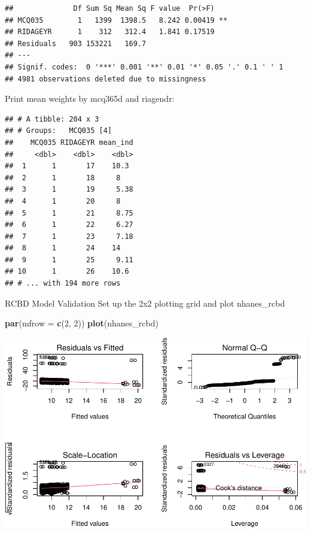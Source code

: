 \documentclass[]{book}
\newenvironment{Shaded}{\begin{snugshade}}{\end{snugshade}}
\newcommand{\DataTypeTok}[1]{\textcolor[rgb]{0.13,0.29,0.53}{#1}}
\newcommand{\DecValTok}[1]{\textcolor[rgb]{0.00,0.00,0.81}{#1}}
\newcommand{\KeywordTok}[1]{\textcolor[rgb]{0.13,0.29,0.53}{\textbf{#1}}}
\newcommand{\NormalTok}[1]{#1}
\newcommand{\OperatorTok}[1]{\textcolor[rgb]{0.81,0.36,0.00}{\textbf{#1}}}
\newcommand{\OtherTok}[1]{\textcolor[rgb]{0.56,0.35,0.01}{#1}}
\newcommand{\StringTok}[1]{\textcolor[rgb]{0.31,0.60,0.02}{#1}}
\begin{document}
\begin{verbatim}
##              Df Sum Sq Mean Sq F value  Pr(>F)   
## MCQ035        1   1399  1398.5   8.242 0.00419 **
## RIDAGEYR      1    312   312.4   1.841 0.17519   
## Residuals   903 153221   169.7                   
## ---
## Signif. codes:  0 '***' 0.001 '**' 0.01 '*' 0.05 '.' 0.1 ' ' 1
## 4981 observations deleted due to missingness
\end{verbatim}

Print mean weights by mcq365d and riagendr:

\begin{Shaded}
\end{Shaded}

\begin{verbatim}
## # A tibble: 204 x 3
## # Groups:   MCQ035 [4]
##    MCQ035 RIDAGEYR mean_ind
##     <dbl>    <dbl>    <dbl>
##  1      1       17    10.3 
##  2      1       18     8   
##  3      1       19     5.38
##  4      1       20     8   
##  5      1       21     8.75
##  6      1       22     6.27
##  7      1       23     7.18
##  8      1       24    14   
##  9      1       25     9.11
## 10      1       26    10.6 
## # ... with 194 more rows
\end{verbatim}

RCBD Model Validation
Set up the 2x2 plotting grid and plot nhanes\_rcbd

\begin{Shaded}
\begin{Highlighting}[]
\KeywordTok{par}\NormalTok{(}\DataTypeTok{mfrow =} \KeywordTok{c}\NormalTok{(}\DecValTok{2}\NormalTok{, }\DecValTok{2}\NormalTok{))}
\KeywordTok{plot}\NormalTok{(nhanes_rcbd)}
\end{Highlighting}
\end{Shaded}

\includegraphics{code4stem_files/figure-latex/2x2 grid-1.pdf}
\end{document}

